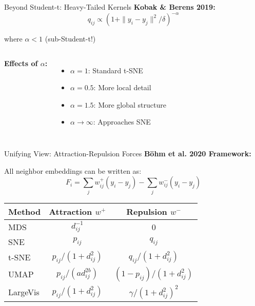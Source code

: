 \begin{frame}{Beyond Student-t: Heavy-Tailed Kernels}
\textbf{Kobak \& Berens 2019:}
$$q_{ij} \propto (1 + \|y_i - y_j\|^2/\delta)^{-\alpha}$$

where $\alpha < 1$ (sub-Student-t!)

\begin{columns}
    \textbf{Effects of $\alpha$:}
    \begin{itemize}
        \item $\alpha = 1$: Standard t-SNE
        \item $\alpha = 0.5$: More local detail
        \item $\alpha = 1.5$: More global structure
        \item $\alpha \to \infty$: Approaches SNE
    \end{itemize}

    \begin{center}
    \end{center}
\end{columns}
\end{frame}

\begin{frame}{Unifying View: Attraction-Repulsion Forces}
\textbf{Böhm et al. 2020 Framework:}

All neighbor embeddings can be written as:
$$F_i = \sum_j w_{ij}^{+} (y_i - y_j) - \sum_j w_{ij}^{-} (y_i - y_j)$$

\begin{center}
\begin{tabular}{l|c|c}
\textbf{Method} & \textbf{Attraction $w^+$} & \textbf{Repulsion $w^-$} \\
\hline
MDS & $d_{ij}^{-1}$ & 0 \\
SNE & $p_{ij}$ & $q_{ij}$ \\
t-SNE & $p_{ij}/(1+d_{ij}^2)$ & $q_{ij}/(1+d_{ij}^2)$ \\
UMAP & $p_{ij}/(ad_{ij}^{2b})$ & $(1-p_{ij})/(1+d_{ij}^2)$ \\
LargeVis & $p_{ij}/(1+d_{ij}^2)$ & $\gamma/(1+d_{ij}^2)^2$ \\
\end{tabular}
\end{center}

\end{frame}

